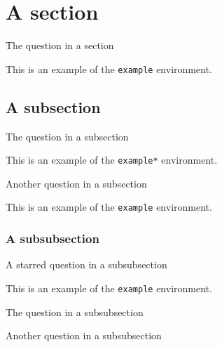 \documentclass{scrartcl}
\begin{document}
\section{A section}

\begin{question}
The question in a section
\end{question}

\begin{example}
    This is an example of the \texttt{example} environment.
\end{example}

\subsection{A subsection}

\begin{question}
The question in a subsection
\end{question}

\begin{example*}
    This is an example of the \texttt{example*} environment.
\end{example*}

\begin{question}
Another question in a subsection
\end{question}

\begin{example}
    This is an example of the \texttt{example} environment.
\end{example}

\subsubsection{A subsubsection}

\begin{question*}
A starred question in a subsubsection
\end{question*}

\begin{example}
    This is an example of the \texttt{example} environment.
\end{example}


\begin{question}
The question in a subsubsection
\end{question}

\begin{question}
Another question in a subsubsection
\end{question}
\end{document}
